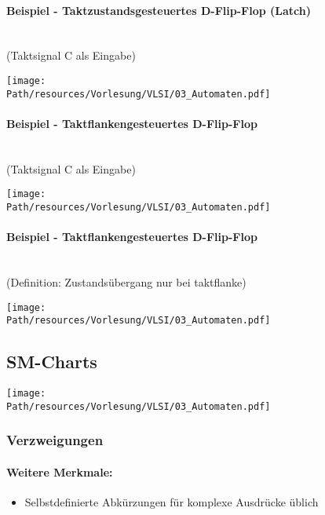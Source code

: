 		\paragraph{Beispiel - Taktzustandsgesteuertes D-Flip-Flop (Latch)}\hfill\\
		(Taktsignal C als Eingabe) 
		\begin{center}
			\texttt{[image: \\Path/resources/Vorlesung/VLSI/03\_Automaten.pdf]}
		\end{center}
	
		\paragraph{Beispiel - Taktflankengesteuertes D-Flip-Flop}\hfill\\
		(Taktsignal C als Eingabe) 
		\begin{center}
			\texttt{[image: \\Path/resources/Vorlesung/VLSI/03\_Automaten.pdf]}
		\end{center}
	
		\paragraph{Beispiel - Taktflankengesteuertes D-Flip-Flop}\hfill\\
		(Definition: Zustandsübergang nur bei taktflanke) 
		\begin{center}
			\texttt{[image: \\Path/resources/Vorlesung/VLSI/03\_Automaten.pdf]}
		\end{center}
	
\subsection{SM-Charts}
		\begin{center}
			\texttt{[image: \\Path/resources/Vorlesung/VLSI/03\_Automaten.pdf]}
		\end{center}
		
		\subsubsection{Verzweigungen}
			\paragraph{Weitere Merkmale:}
			\begin{itemize}
				\item Selbstdefinierte Abkürzungen für komplexe Ausdrücke üblich
			\end{itemize}
	
